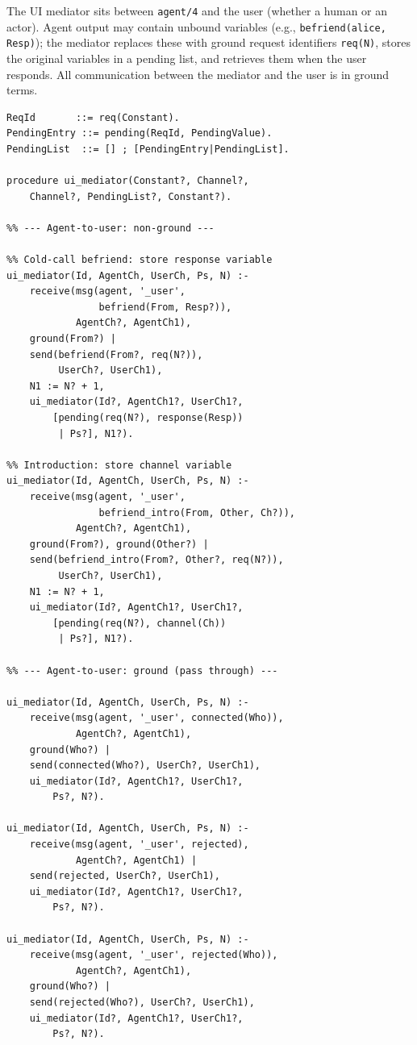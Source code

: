 The UI mediator sits between \verb|agent/4| and the user (whether a human or an actor). Agent output may contain unbound variables (e.g., \verb|befriend(alice, Resp)|); the mediator replaces these with ground request identifiers \verb|req(N)|, stores the original variables in a pending list, and retrieves them when the user responds. All communication between the mediator and the user is in ground terms.

\begin{verbatim}
ReqId       ::= req(Constant).
PendingEntry ::= pending(ReqId, PendingValue).
PendingList  ::= [] ; [PendingEntry|PendingList].

procedure ui_mediator(Constant?, Channel?,
    Channel?, PendingList?, Constant?).

%% --- Agent-to-user: non-ground ---

%% Cold-call befriend: store response variable
ui_mediator(Id, AgentCh, UserCh, Ps, N) :-
    receive(msg(agent, '_user',
                befriend(From, Resp?)),
            AgentCh?, AgentCh1),
    ground(From?) |
    send(befriend(From?, req(N?)),
         UserCh?, UserCh1),
    N1 := N? + 1,
    ui_mediator(Id?, AgentCh1?, UserCh1?,
        [pending(req(N?), response(Resp))
         | Ps?], N1?).

%% Introduction: store channel variable
ui_mediator(Id, AgentCh, UserCh, Ps, N) :-
    receive(msg(agent, '_user',
                befriend_intro(From, Other, Ch?)),
            AgentCh?, AgentCh1),
    ground(From?), ground(Other?) |
    send(befriend_intro(From?, Other?, req(N?)),
         UserCh?, UserCh1),
    N1 := N? + 1,
    ui_mediator(Id?, AgentCh1?, UserCh1?,
        [pending(req(N?), channel(Ch))
         | Ps?], N1?).

%% --- Agent-to-user: ground (pass through) ---

ui_mediator(Id, AgentCh, UserCh, Ps, N) :-
    receive(msg(agent, '_user', connected(Who)),
            AgentCh?, AgentCh1),
    ground(Who?) |
    send(connected(Who?), UserCh?, UserCh1),
    ui_mediator(Id?, AgentCh1?, UserCh1?,
        Ps?, N?).

ui_mediator(Id, AgentCh, UserCh, Ps, N) :-
    receive(msg(agent, '_user', rejected),
            AgentCh?, AgentCh1) |
    send(rejected, UserCh?, UserCh1),
    ui_mediator(Id?, AgentCh1?, UserCh1?,
        Ps?, N?).

ui_mediator(Id, AgentCh, UserCh, Ps, N) :-
    receive(msg(agent, '_user', rejected(Who)),
            AgentCh?, AgentCh1),
    ground(Who?) |
    send(rejected(Who?), UserCh?, UserCh1),
    ui_mediator(Id?, AgentCh1?, UserCh1?,
        Ps?, N?).


\end{verbatim}
